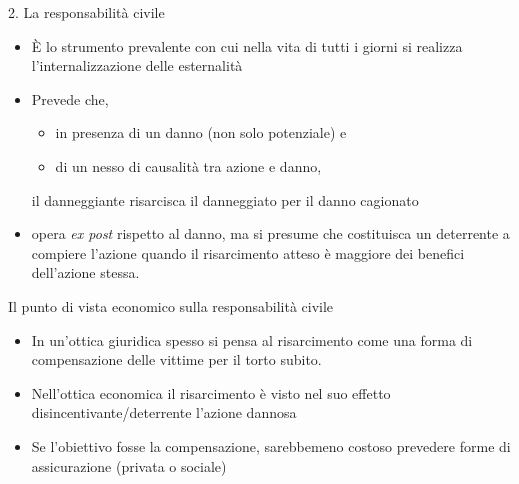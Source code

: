 \documentclass[aspectratio=64,11pt]{beamer}
\begin{document}
\begin{frame}{2. La responsabilità civile}
\begin{itemize}
\item È lo strumento prevalente con cui nella vita di tutti i giorni si realizza
l'internalizzazione delle esternalità
\item Prevede che,
\begin{itemize}
\item in presenza di un danno (non solo potenziale) e
\item di un nesso di causalità tra azione e danno,
\end{itemize}
il danneggiante risarcisca il danneggiato per il danno cagionato
\item opera \emph{ex post} rispetto al danno, ma si presume che costituisca un
deterrente a compiere l'azione quando il risarcimento atteso è maggiore dei
benefici dell'azione stessa.
\end{itemize}

\begin{block}{Il punto di vista economico sulla responsabilità civile}
\fontsize{10}{11}\selectfont
\begin{itemize}
\item In un'ottica giuridica spesso si pensa al risarcimento come una forma di
\alert{compensazione delle vittime} per il torto subito.
\item Nell'ottica economica il risarcimento è visto nel suo effetto
disincentivante/deterrente l'azione dannosa
\item Se l'obiettivo fosse la compensazione, sarebbemeno costoso prevedere forme
di assicurazione (privata o sociale)
\end{itemize}
\end{block}
\end{frame}
\end{document}
